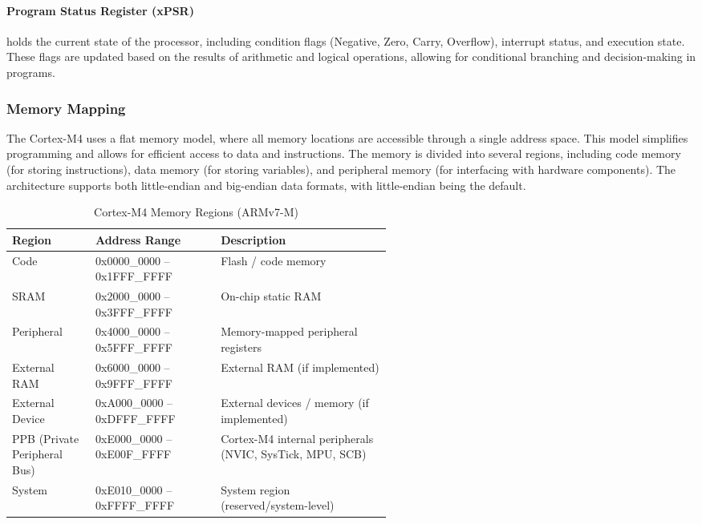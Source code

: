 \paragraph{Program Status Register (xPSR)}
holds the current state of the processor, including condition flags (Negative, Zero, Carry, Overflow), interrupt status, and execution state. These flags are updated based on the results of arithmetic and logical operations, allowing for conditional branching and decision-making in programs.

\subsubsection{Memory Mapping}
The Cortex-M4 uses a flat memory model, where all memory locations are accessible through a single address space. This model simplifies programming and allows for efficient access to data and instructions. The memory is divided into several regions, including code memory (for storing instructions), data memory (for storing variables), and peripheral memory (for interfacing with hardware components). The architecture supports both little-endian and big-endian data formats, with little-endian being the default.
\begin{table}[H] %
\centering
\caption{Cortex-M4 Memory Regions (ARMv7-M)}
\small
\begin{tabularx}{\linewidth}{@{}p{0.22\linewidth}p{0.33\linewidth}X@{}}
\toprule
\textbf{Region} & \textbf{Address Range} & \textbf{Description} \\
\midrule
Code            & 0x0000\_0000 -- 0x1FFF\_FFFF & Flash / code memory \\
SRAM            & 0x2000\_0000 -- 0x3FFF\_FFFF & On-chip static RAM \\
Peripheral      & 0x4000\_0000 -- 0x5FFF\_FFFF & Memory-mapped peripheral registers \\
External RAM    & 0x6000\_0000 -- 0x9FFF\_FFFF & External RAM (if implemented) \\
External Device & 0xA000\_0000 -- 0xDFFF\_FFFF & External devices / memory (if implemented) \\
PPB (Private Peripheral Bus) & 0xE000\_0000 -- 0xE00F\_FFFF & Cortex-M4 internal peripherals (NVIC, SysTick, MPU, SCB) \\
System          & 0xE010\_0000 -- 0xFFFF\_FFFF & System region (reserved/system-level) \\
\bottomrule
\end{tabularx}
\end{table}


